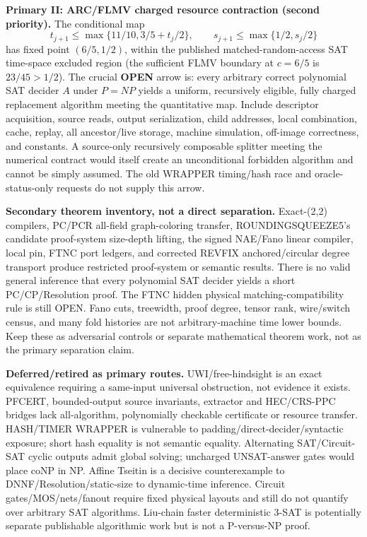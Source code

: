 \documentclass[11pt]{article}
\begin{document}
\noindent\textbf{Primary II: ARC/FLMV charged resource contraction (second priority).}
The conditional map
\[
t_{j+1}\le\max\{11/10,3/5+t_j/2\},\qquad
s_{j+1}\le\max\{1/2,s_j/2\}
\]
has fixed point $(6/5,1/2)$, within the published matched-random-access SAT time-space excluded region (the sufficient FLMV boundary at $c=6/5$ is $23/45>1/2$). The crucial \textbf{OPEN} arrow is: every arbitrary correct polynomial SAT decider $A$ under $P=NP$ yields a uniform, recursively eligible, fully charged replacement algorithm meeting the quantitative map. Include descriptor acquisition, source reads, output serialization, child addresses, local combination, cache, replay, all ancestor/live storage, machine simulation, off-image correctness, and constants. A source-only recursively composable splitter meeting the numerical contract would itself create an unconditional forbidden algorithm and cannot be simply assumed. The old WRAPPER timing/hash race and oracle-status-only requests do not supply this arrow.

\noindent\textbf{Secondary theorem inventory, not a direct separation.}
Exact-(2,2) compilers, PC/PCR all-field graph-coloring transfer, ROUNDINGSQUEEZE5's candidate proof-system size-depth lifting, the signed NAE/Fano linear compiler, local pin, FTNC port ledgers, and corrected REVFIX anchored/circular degree transport produce restricted proof-system or semantic results. There is no valid general inference that every polynomial SAT decider yields a short PC/CP/Resolution proof. The FTNC hidden physical matching-compatibility rule is still OPEN. Fano cuts, treewidth, proof degree, tensor rank, wire/switch census, and many fold histories are not arbitrary-machine time lower bounds. Keep these as adversarial controls or separate mathematical theorem work, not as the primary separation claim.

\noindent\textbf{Deferred/retired as primary routes.}
UWI/free-hindsight is an exact equivalence requiring a same-input universal obstruction, not evidence it exists. PFCERT, bounded-output source invariants, extractor and HEC/CRS-PPC bridges lack all-algorithm, polynomially checkable certificate or resource transfer. HASH/TIMER WRAPPER is vulnerable to padding/direct-decider/syntactic exposure; short hash equality is not semantic equality. Alternating SAT/Circuit-SAT cyclic outputs admit global solving; uncharged UNSAT-answer gates would place coNP in NP. Affine Tseitin is a decisive counterexample to DNNF/Resolution/static-size to dynamic-time inference. Circuit gates/MOS/nets/fanout require fixed physical layouts and still do not quantify over arbitrary SAT algorithms. Liu-chain faster deterministic 3-SAT is potentially separate publishable algorithmic work but is not a P-versus-NP proof.
\end{document}
